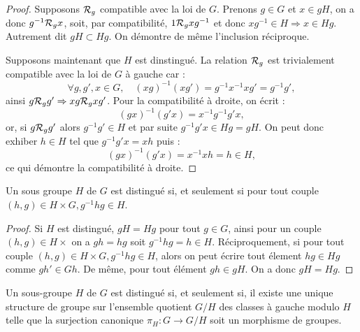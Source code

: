 \begin{proof}
Supposons $\mathcal{R}_g$ compatible avec la loi de $G$. Prenons $g \in G$ et $x \in gH$, on a donc $g^{-1} \mathcal{R}_g x$, soit, par compatibilité,
$1 \mathcal{R}_g x g^{-1}$ et donc $x g^{-1} \in H \Rightarrow x \in Hg$. Autrement dit $gH \subset Hg$. 
On démontre de même l'inclusion réciproque. \newline

Supposons maintenant que $H$ est dinstingué.
La relation $\mathcal{R}_g$ est trivialement compatible avec la loi de $G$ à gauche car :
\[ \forall g, g', x \in G, \quad  (xg)^{-1} (xg') = g^{-1} x^{-1} x g' = g^{-1} g' , \]
ainsi $g \mathcal{R}_g g' \Rightarrow xg \mathcal{R}_g xg'$. Pour la compatibilité à droite, on écrit :
\[ (gx)^{-1} (g'x) = x^{-1} g^{-1} g' x , \]
or, si $g \mathcal{R}_g g'$ alors $g^{-1} g' \in H$ et par suite $g^{-1} g' x \in Hg = gH$. 
On peut donc exhiber $h \in H$ tel que $g^{-1} g' x = x h$ puis :
\[ (gx)^{-1} (g'x) = x^{-1} x h  = h \in H , \]
ce qui démontre la compatibilité à droite.
\end{proof}

\begin{lem}
\label{lem:disting}
Un sous groupe $H$ de $G$ est distingué si, et seulement si pour tout couple $(h,g) \in H \times G, g^{-1} h g \in H$.
\end{lem}

\begin{proof}
Si $H$ est distingué, $gH = Hg$ pour tout $g \in G$, ainsi pour un couple $(h,g) \in H \times$ on a $gh = hg$ soit $g^{-1}hg = h \in H$.
Réciproquement, si pour tout couple $(h,g) \in H \times G, g^{-1} h g \in H$, alors on peut écrire tout élement $hg \in Hg$ comme
$gh' \in Gh$. De même, pour tout élément $gh \in gH$. On a donc $gH = Hg$.
\end{proof}

\begin{thm}[1er d'isomoprhisme]
Un sous-groupe $H$ de $G$ est distingué si, et seulement si, il existe une unique structure de groupe sur l'ensemble quotient $G/H$
des classes à gauche modulo $H$ telle que la surjection canonique $\pi_H :  G \to G/H$ soit un morphisme de groupes.
\end{thm}

